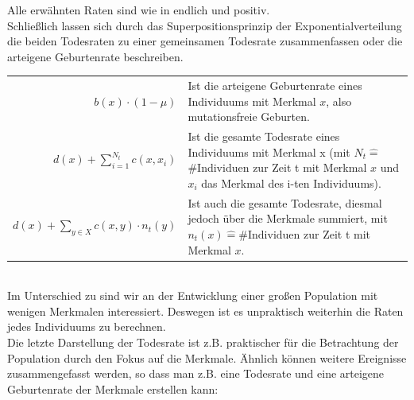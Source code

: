 \documentclass[11pt, a4paper, german]{article}
\theoremstyle{plain}
\begin{document}
	Alle erwähnten Raten sind wie in \cite{fournier2004microscopic} endlich und positiv. \\
	Schließlich lassen sich durch das Superpositionsprinzip der Exponentialverteilung die beiden Todesraten zu einer gemeinsamen Todesrate zusammenfassen oder die arteigene Geburtenrate beschreiben.\\
	
	\begin{tabular}{ r p{18em} }
		$ b(x) \cdot (1 - \mu) $ & Ist die arteigene Geburtenrate eines Individuums mit Merkmal $ x $, also mutationsfreie Geburten.\\
		$ d(x) + \sum_{i=1}^{N_t} c(x, x_i) $ & Ist die gesamte Todesrate eines Individuums mit Merkmal x (mit $ N_t \hat{=} $ \#Individuen zur Zeit t mit Merkmal $ x $ und $ x_i $ das Merkmal des i-ten Individuums).\\
		$ d(x) + \sum_{y \in X} c(x,y) \cdot n_t(y) $ & Ist auch die gesamte Todesrate, diesmal jedoch über die Merkmale summiert, mit $ n_t(x) \hat{=} \text{\#Individuen}$ zur Zeit t mit Merkmal $ x $.
	\end{tabular}\\
	
	Im Unterschied zu \cite{Champagnat20061127} sind wir an der Entwicklung einer großen Population mit wenigen Merkmalen interessiert. Deswegen ist es unpraktisch weiterhin die Raten jedes Individuums zu berechnen.\\
	Die letzte Darstellung der Todesrate ist z.B. praktischer für die Betrachtung der Population durch den Fokus auf die Merkmale. Ähnlich können weitere Ereignisse zusammengefasst werden, so dass man z.B. eine Todesrate und eine arteigene Geburtenrate der Merkmale erstellen kann:
	
\end{document}
